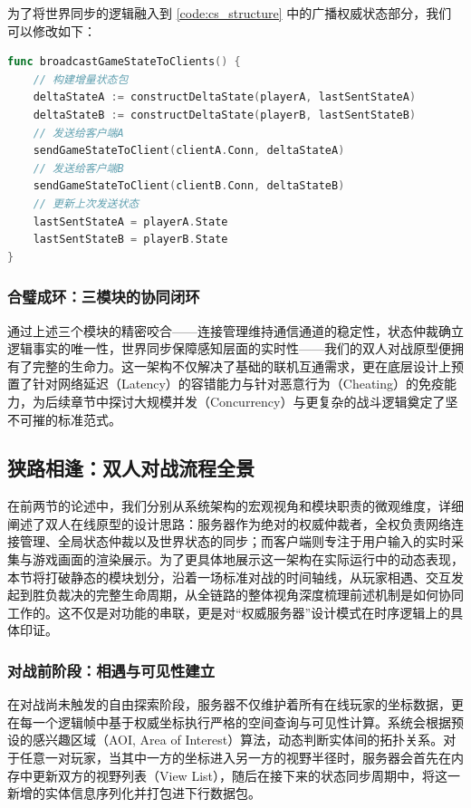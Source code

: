 为了将世界同步的逻辑融入到 \ref{code:cs_structure} 中的广播权威状态部分，我们可以修改如下：
\begin{tcolorbox}[title=世界同步伪代码示例]
\begin{lstlisting}[style=codeblock, language=go]
func broadcastGameStateToClients() {
    // 构建增量状态包
    deltaStateA := constructDeltaState(playerA, lastSentStateA)
    deltaStateB := constructDeltaState(playerB, lastSentStateB)
    // 发送给客户端A
    sendGameStateToClient(clientA.Conn, deltaStateA)
    // 发送给客户端B
    sendGameStateToClient(clientB.Conn, deltaStateB)
    // 更新上次发送状态
    lastSentStateA = playerA.State
    lastSentStateB = playerB.State
}
\end{lstlisting}
\end{tcolorbox}

\subsubsection{合璧成环：三模块的协同闭环}

通过上述三个模块的精密咬合——连接管理维持通信通道的稳定性，状态仲裁确立逻辑事实的唯一性，世界同步保障感知层面的实时性——我们的双人对战原型便拥有了完整的生命力。这一架构不仅解决了基础的联机互通需求，更在底层设计上预置了针对网络延迟（Latency）的容错能力与针对恶意行为（Cheating）的免疫能力，为后续章节中探讨大规模并发（Concurrency）与更复杂的战斗逻辑奠定了坚不可摧的标准范式。


\subsection{狭路相逢：双人对战流程全景}


在前两节的论述中，我们分别从系统架构的宏观视角和模块职责的微观维度，详细阐述了双人在线原型的设计思路：服务器作为绝对的权威仲裁者，全权负责网络连接管理、全局状态仲裁以及世界状态的同步；而客户端则专注于用户输入的实时采集与游戏画面的渲染展示。为了更具体地展示这一架构在实际运行中的动态表现，本节将打破静态的模块划分，沿着一场标准对战的时间轴线，从玩家相遇、交互发起到胜负裁决的完整生命周期，从全链路的整体视角深度梳理前述机制是如何协同工作的。这不仅是对功能的串联，更是对“权威服务器”设计模式在时序逻辑上的具体印证。

\subsubsection{对战前阶段：相遇与可见性建立}

在对战尚未触发的自由探索阶段，服务器不仅维护着所有在线玩家的坐标数据，更在每一个逻辑帧中基于权威坐标执行严格的空间查询与可见性计算。系统会根据预设的感兴趣区域（AOI, Area of Interest）算法，动态判断实体间的拓扑关系。对于任意一对玩家，当其中一方的坐标进入另一方的视野半径时，服务器会首先在内存中更新双方的视野列表（View List），随后在接下来的状态同步周期中，将这一新增的实体信息序列化并打包进下行数据包。

